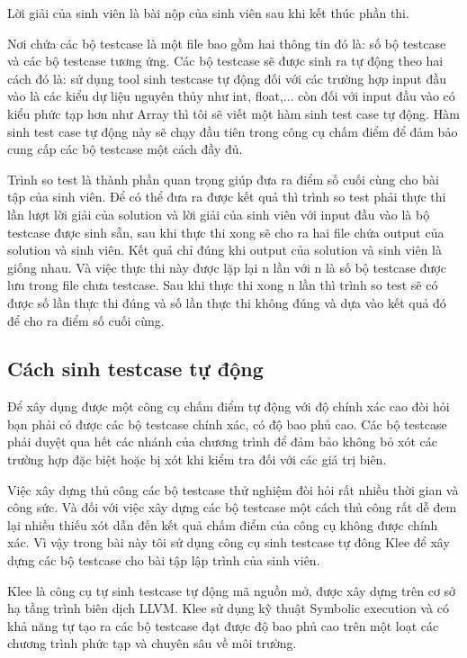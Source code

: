 \documentclass[12pt,a4paper]{article}
\begin{document}
Lời giải của sinh viên là bài nộp của sinh viên sau khi kết thúc phần thi.

Nơi chứa các bộ testcase là một file bao gồm hai thông tin đó là: số bộ testcase và các bộ testcase tương ứng. Các bộ testcase sẽ được sinh ra tự động theo hai cách đó là: sử dụng tool sinh testcase tự động đối với các trường hợp input đầu vào là các kiểu dự liệu nguyên thủy như int, float,... còn đối với input đầu vào có kiểu phức tạp hơn như Array thì tôi sẽ viết một hàm sinh test case tự động. Hàm sinh test case tự động này sẽ chạy đầu tiên trong công cụ chấm điểm để đảm bảo cung cấp các bộ testcase một cách đầy đủ.

Trình so test là thành phần quan trọng giúp đưa ra điểm số cuối cùng cho bài tập của sinh viên. Để có thể đưa ra được kết quả thì trình so test phải thực thi lần lượt lời giải của solution và lời giải của sinh viên với input đầu vào là bộ testcase được sinh sẵn, sau khi thực thi xong sẽ cho ra hai file chứa output của solution và sinh viên. Kết quả chỉ đúng khi output của solution và sinh viên là giống nhau. Và việc thực thi này được lặp lại n lần với n là số bộ testcase được lưu trong file chưa testcase. Sau khi thực thi xong n lần thì trình so test sẽ có được số lần thực thi đúng và số lần thực thi không đúng và dựa vào kết quả đó để cho ra điểm số cuối cùng.

\subsection{Cách sinh testcase tự động}

Để xây dụng được một công cụ chấm điểm tự động với độ chính xác cao đòi hỏi bạn phải có được các bộ testcase chính xác, có độ bao phủ cao. Các bộ testcase phải duyệt qua hết các nhánh của chương trình để đảm bảo không bỏ xót các trường hợp đặc biệt hoặc bị xót khi kiểm tra đối với các giá trị biên.

Việc xây dựng thủ công các bộ testcase thử nghiệm đòi hỏi rất nhiều thời gian và công sức. Và đối với việc xây dựng các bộ testcase một cách thủ công rất dễ đem lại nhiều thiếu xót dẫn đến kết quả chấm điểm của công cụ không được chính xác. Vì vậy trong bài này tôi sử dụng công cụ sinh testcase tự đông Klee để xây dựng các bộ testcase cho bài tập lập trình của sinh viên.

Klee là công cụ tự sinh testcase tự động mã nguồn mở, được xây dựng trên cơ sở hạ tầng trình biên dịch LLVM. Klee sử dụng kỹ thuật Symbolic execution và có khả năng tự tạo ra các bộ testcase đạt được độ bao phủ cao trên một loạt các chương trình phức tạp và chuyên sâu về môi trường.
\end{document}
